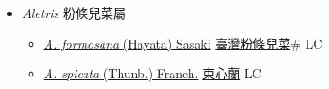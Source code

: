 
  \begin{itemize}
 \item[] \textit{Aletris} 粉條兒菜屬
                    
  \begin{itemize}
        \item[] \href{http://www.theplantlist.org/tpl1.1/search?q=Aletris+formosana}{\textit{A. formosana} (Hayata) Sasaki}   \href{\detokenize{http://taibnet.sinica.edu.tw/chi/taibnet_species_list.php?T2=臺灣粉條兒菜&T2_new_value=true&fr=y}}{臺灣粉條兒菜}\# LC
        \item[] \href{http://www.theplantlist.org/tpl1.1/search?q=Aletris+spicata}{\textit{A. spicata} (Thunb.) Franch.}   \href{\detokenize{http://taibnet.sinica.edu.tw/chi/taibnet_species_list.php?T2=束心蘭&T2_new_value=true&fr=y}}{束心蘭} LC
  \end{itemize}
  \end{itemize}
